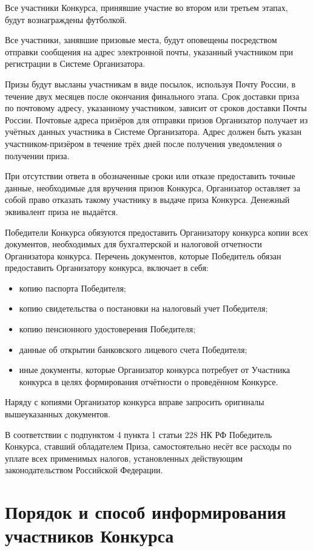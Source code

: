 Все участники Конкурса, принявшие участие во втором или третьем этапах, будут вознаграждены футболкой.

Все участники, занявшие призовые места, будут оповещены посредством отправки сообщения на адрес электронной почты, указанный участником при
регистрации в Системе Организатора. 

Призы будут высланы участникам в виде посылок, используя Почту России, в течение двух месяцев после окончания финального этапа. Срок
доставки приза по почтовому адресу, указанному участником, зависит от сроков доставки Почты России. Почтовые адреса призёров для отправки
призов Организатор получает из учётных данных участника в Системе Организатора. Адрес должен быть указан участником-призёром в течение трёх
дней после получения уведомления о получении приза.

При отсутствии ответа в обозначенные сроки или отказе предоставить точные данные, необходимые для вручения призов Конкурса, Организатор
оставляет за собой право отказать такому участнику в выдаче приза Конкурса. Денежный эквивалент приза не выдаётся.
 
Победители Конкурса обязуются предоставить Организатору конкурса копии всех документов, необходимых для бухгалтерской и налоговой отчетности
Организатора конкурса. Перечень документов, которые Победитель обязан предоставить Организатору конкурса, включает в себя:
\begin{itemize}
\item копию паспорта Победителя;
\item копию свидетельства о постановки на налоговый учет Победителя;
\item копию пенсионного удостоверения Победителя;
\item данные об открытии банковского лицевого счета Победителя;
\item иные документы, которые Организатор конкурса потребует от Участника конкурса в целях формирования отчётности о проведённом Конкурсе.
\end{itemize}

Наряду с копиями Организатор конкурса вправе запросить оригиналы вышеуказанных документов.

В соответствии с подпунктом 4 пункта 1 статьи 228 НК РФ Победитель Конкурса, ставший обладателем Приза, самостоятельно несёт все расходы по
уплате всех применимых налогов, установленных действующим законодательством Российской Федерации.

\section{Порядок и способ информирования участников Конкурса}

